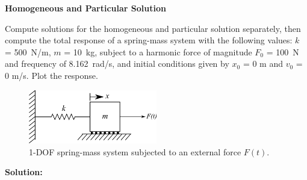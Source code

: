 \documentclass[12pt,letter]{article}
\begin{document}
\begin{example}

	\textbf{Homogeneous and Particular Solution}

	\noindent Compute solutions for the homogeneous and particular solution separately, then compute the total response of a spring-mass system with the following values: $k$ = 500~N/m, $m$ = 10~kg, subject to a harmonic force of magnitude $F_0$ = 100~N and frequency of 8.162~rad/s, and initial conditions given by $x_0$ = 0 m and $v_0$ = 0 m/s. Plot the response.
	
	\begin{figure}[H]
		\centering
		\includegraphics[width=0.5\textwidth]{../figures/1-DOF-spring_mass_horizontal_forced.png}
		\caption{1-DOF spring-mass system subjected to an external force $F(t)$.}
	\end{figure}
	
	\noindent\textbf{Solution:}


\end{example}
\end{document}
